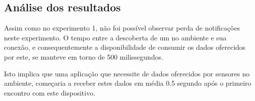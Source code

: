 \begin{table}[ht]
	\begin{center}
	\end{center}
\end{table}

\begin{table}[ht]
	\begin{center}
	\end{center}
\end{table}

\subsection{Análise dos resultados}

Assim como no experimento 1, não foi possível observar perda de notificações neste experimento.
O tempo entre a descoberta de um \smartobj no ambiente e sua conexão, e consequentemente a disponibilidade de consumir os dados oferecidos por este, se manteve em torno de 500 milissegundos.

Isto implica que uma aplicação que necessite de dados oferecidos por sensores no ambiente, começaria a receber estes dados em média 0.5 segundo após o primeiro encontro com este dispositivo.

